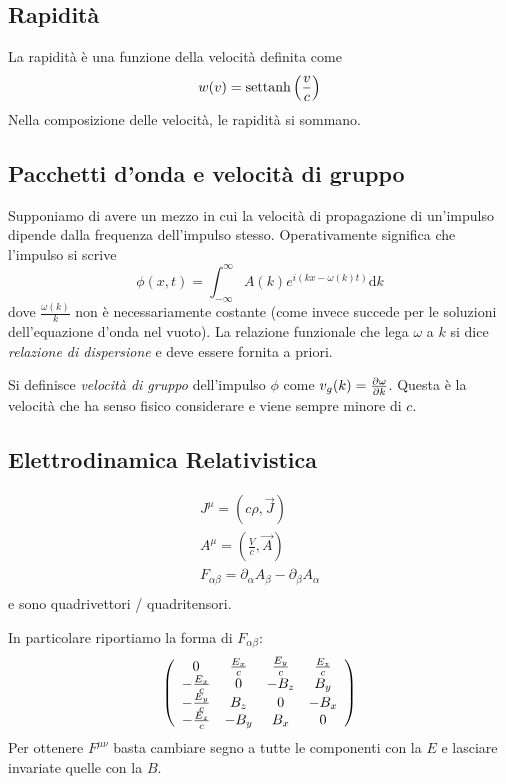 \documentclass[10pt,a4paper]{article}
\newcommand{\de}{{\ensuremath{ \mbox{d}}}}
\begin{document}
\begin{multicols}{2}
  \subsection*{Rapidità}
  La rapidità è una funzione della velocità definita come
  $$ w(v) = \text{settanh} \left({\frac{v}{c}}\right) $$
  Nella composizione delle velocità, le rapidità si sommano.

  \subsection*{Pacchetti d'onda e velocità di gruppo}
  Supponiamo di avere un mezzo in cui la velocità di propagazione di un'impulso dipende dalla frequenza dell'impulso stesso. Operativamente significa che l'impulso si scrive
  $$ \phi(x, t) = \int_{-\infty}^{\infty} A(k) e^{i(k x - \omega(k) t)} \de k$$
  dove $\frac{\omega(k)}{k}$ non è necessariamente costante (come invece succede per le soluzioni dell'equazione d'onda nel vuoto). La relazione funzionale che lega $\omega$ a $k$ si dice {\it relazione di dispersione} e deve essere fornita a priori.

  Si definisce {\it velocità di gruppo} dell'impulso $\phi$ come $v_g(k) = \frac{\partial {\omega}}{\partial {k}}$. Questa è la velocità che ha senso fisico considerare e viene sempre minore di $c$.

  \subsection*{Elettrodinamica Relativistica}
  \begin{displaymath}
    \begin{array}{c}
      J^\mu = (c\rho, \vec J) \\
      A^\mu = (\frac{V}{c}, \vec A) \\
      F_{\alpha\beta} = \partial_\alpha A_\beta - \partial_\beta A_\alpha \\
    \end{array}
  \end{displaymath}
  e sono quadrivettori / quadritensori.

  In particolare riportiamo la forma di $F_{\alpha\beta}$:
  \begin{displaymath}
    \left({
      \begin{array}{cccc}
        0               & \frac{E_x}{c} & \frac{E_y}{c} & \frac{E_z}{c} \\
        - \frac{E_x}{c} & 0             & - B_z         & B_y           \\
        - \frac{E_y}{c} & B_z           & 0             & - B_x         \\
        - \frac{E_z}{c} & - B_y         & B_x           & 0             \\
      \end{array}
    }\right)
  \end{displaymath}
  Per ottenere $F^{\mu\nu}$ basta cambiare segno a tutte le componenti con la $E$ e lasciare invariate quelle con la $B$.
  

\end{multicols}
\end{document}
